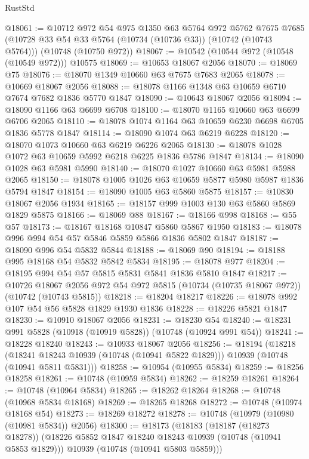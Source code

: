 \begin{lexlean}{RustStd}
\begin{coremodule}
{\begin{coremodule}
{{{{{@18061 := @10712
    @972
    @54
    @975
    @1350
    @63
    @5764
    @972
    @5762
    @7675
    @7685
    (@10728 @33 @54 @33 @5764 (@10734 (@10736 @33)) (@10742 (@10743 @5764)))
    (@10748 (@10750 @972))
@18067 := @10542 (@10544 @972 (@10548 (@10549 @972))) @10575
@18069 := @10653 @18067 @2056
@18070 := @18069 @75
@18076 := @18070 @1349 @10660 @63 @7675 @7683 @2065
@18078 := @10669 @18067 @2056
@18088 := @18078 @1166 @1348 @63 @10659 @6710 @7674 @7682 @1836 @5770 @1847
@18090 := @10643 @18067 @2056
@18094 := @18090 @1166 @63 @6699 @6708
@18100 := @18070 @1165 @10660 @63 @6699 @6706 @2065
@18110 := @18078 @1074 @1164 @63 @10659 @6230 @6698 @6705 @1836 @5778 @1847
@18114 := @18090 @1074 @63 @6219 @6228
@18120 := @18070 @1073 @10660 @63 @6219 @6226 @2065
@18130 := @18078 @1028 @1072 @63 @10659 @5992 @6218 @6225 @1836 @5786 @1847
@18134 := @18090 @1028 @63 @5981 @5990
@18140 := @18070 @1027 @10660 @63 @5981 @5988 @2065
@18150 := @18078 @1005 @1026 @63 @10659 @5877 @5980 @5987 @1836 @5794 @1847
@18154 := @18090 @1005 @63 @5860 @5875
@18157 := @10830 @18067 @2056 @1934
@18165 := @18157 @999 @1003 @130 @63 @5860 @5869 @1829 @5875
@18166 := @18069 @88
@18167 := @18166 @998
@18168 := @55 @57
@18173 := @18167 @18168 @10847 @5860 @5867 @1950
@18183 := @18078 @996 @994 @54 @57 @5846 @5859 @5866 @1836 @5802 @1847
@18187 := @18090 @996 @54 @5832 @5844
@18188 := @18069 @90
@18194 := @18188 @995 @18168 @54 @5832 @5842 @5834
@18195 := @18078 @977
@18204 := @18195 @994 @54 @57 @5815 @5831 @5841 @1836 @5810 @1847
@18217 := @10726
    @18067
    @2056
    @972
    @54
    @972
    @5815
    (@10734 (@10735 @18067 @972))
    (@10742 (@10743 @5815))
@18218 := @18204 @18217
@18226 := @18078 @992 @107 @54 @56 @5828 @1829 @1930 @1836
@18228 := @18226 @5821 @1847
@18230 := @10910 @18067 @2056
@18231 := @18230 @54
@18240 := @18231 @991 @5828 (@10918 (@10919 @5828)) (@10748 (@10924 @991 @54))
@18241 := @18228 @18240
@18243 := @10933 @18067 @2056
@18256 := @18194
    (@18218
      (@18241 @18243 @10939 (@10748 (@10941 @5822 @1829)))
      @10939
      (@10748 (@10941 @5811 @5831)))
@18258 := @10954 (@10955 @5834)
@18259 := @18256 @18258
@18261 := @10748 (@10959 @5834)
@18262 := @18259 @18261
@18264 := @10748 (@10964 @5834)
@18265 := @18262 @18264
@18268 := @10748 (@10968 @5834 @18168)
@18269 := @18265 @18268
@18272 := @10748 (@10974 @18168 @54)
@18273 := @18269 @18272
@18278 := @10748 (@10979 (@10980 (@10981 @5834)) @2056)
@18300 := @18173
    (@18183
      (@18187 (@18273 @18278))
      (@18226 @5852 @1847 @18240 @18243 @10939 (@10748 (@10941 @5853 @1829)))
      @10939
      (@10748 (@10941 @5803 @5859)))
}}}}}
\end{coremodule}}
\end{coremodule}
\end{lexlean}
